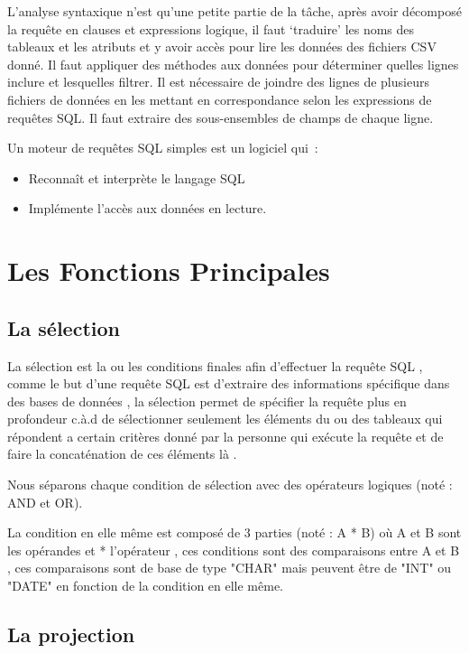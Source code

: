 \documentclass[oneside,13pt,a4paper]{report}
\begin{document}
        L’analyse syntaxique n’est qu’une petite partie de la tâche, 
        après avoir décomposé la requête en clauses et expressions logique, 
        il faut ‘traduire’ les noms des tableaux et les atributs et y avoir accès pour lire les données des fichiers CSV donné. 
        Il faut appliquer des méthodes aux données pour déterminer quelles lignes inclure et lesquelles filtrer. 
        Il est nécessaire de joindre des lignes de plusieurs fichiers de données en les mettant en correspondance selon les expressions de requêtes SQL. 
        Il faut extraire des sous-ensembles de champs de chaque ligne.
        
        Un moteur de requêtes SQL simples est un logiciel qui :
        \begin{itemize}
            \item Reconnaît et interprète le langage SQL
            \item Implémente l’accès aux données en lecture.
        \end{itemize}

    \section{Les Fonctions Principales}

        \subsection{La sélection}

            La sélection est la ou les conditions finales afin d'effectuer la requête SQL , comme le but d'une requête SQL est d'extraire des informations spécifique dans des bases de données , la sélection permet de spécifier la requête plus en profondeur c.à.d de sélectionner seulement les éléments du ou des tableaux qui répondent a certain critères donné par la personne qui exécute la requête et de faire la concaténation de ces éléments là .

    	    Nous séparons chaque condition de sélection avec des opérateurs logiques (noté : AND et OR).

	        La condition en elle même est composé de 3 parties (noté : A * B) où A et B sont les opérandes et * l'opérateur , ces conditions sont des comparaisons entre A et B , ces comparaisons sont de base de type "CHAR" mais peuvent être de "INT" ou "DATE" en fonction de la condition en elle même.

        \subsection{La projection}
\end{document}
